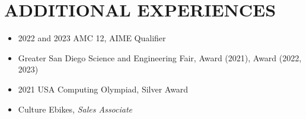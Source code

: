 \section*{ADDITIONAL EXPERIENCES}

\noindent
\begin{itemize}
	\item 2022 and 2023 AMC 12, AIME Qualifier
	\item Greater San Diego Science and Engineering Fair,  Award (2021),  Award (2022, 2023)
	\item 2021 USA Computing Olympiad, Silver Award
	\item Culture Ebikes, \textit{Sales Associate}
\end{itemize}
